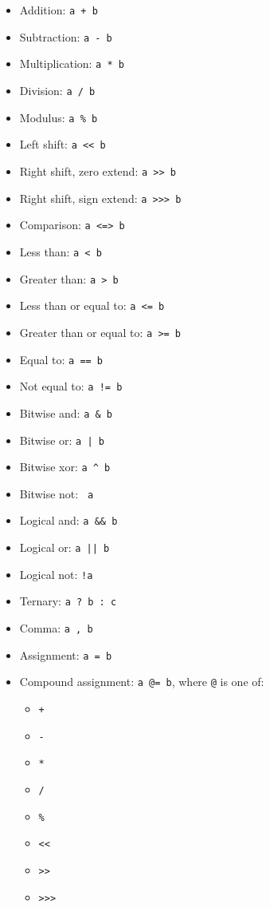 \documentclass[letterpaper,12pt]{book}
\begin{document}
\begin{itemize}
	\item Addition: \texttt{a + b}
	\item Subtraction: \texttt{a - b}
	\item Multiplication: \texttt{a * b}
	\item Division: \texttt{a / b}
	\item Modulus: \texttt{a \% b}
	\item Left shift: \texttt{a << b}
	\item Right shift, zero extend: \texttt{a >> b}
	\item Right shift, sign extend: \texttt{a >>> b}
	\item Comparison: \texttt{a <=> b}
	\item Less than: \texttt{a < b}
	\item Greater than: \texttt{a > b}
	\item Less than or equal to: \texttt{a <= b}
	\item Greater than or equal to: \texttt{a >= b}
	\item Equal to: \texttt{a == b}
	\item Not equal to: \texttt{a != b}
	\item Bitwise and: \texttt{a \& b}
	\item Bitwise or: \texttt{a | b}
	\item Bitwise xor: \texttt{a \^{} b}
	\item Bitwise not: \texttt{~a}
	\item Logical and: \texttt{a \&\& b}
	\item Logical or: \texttt{a || b}
	\item Logical not: \texttt{!a}
	\item Ternary: \texttt{a ? b : c}
	\item Comma: \texttt{a , b}
	\item Assignment: \texttt{a = b}
	\item Compound assignment: \texttt{a @= b}, where \texttt{@} is one of:
	\begin{itemize}
		\item \texttt{+}
		\item \texttt{-}
		\item \texttt{*}
		\item \texttt{/}
		\item \texttt{\%}
		\item \texttt{<<}
		\item \texttt{>>}
		\item \texttt{>>>}

\end{itemize}
\end{itemize}
\end{document}
